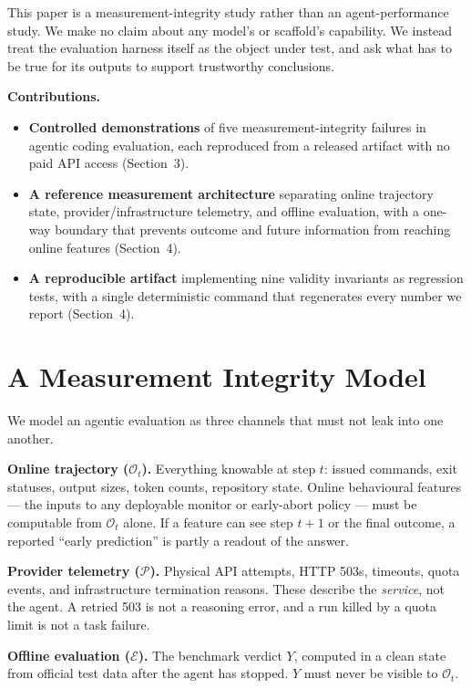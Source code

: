 \documentclass[letterpaper]{article}
\begin{document}
This paper is a measurement-integrity study rather than an agent-performance
study. We make no claim about any model's or scaffold's capability. We instead
treat the evaluation harness itself as the object under test, and ask what has
to be true for its outputs to support trustworthy conclusions.

\vspace{2pt}
\noindent\textbf{Contributions.}
\begin{itemize}\itemsep1pt
\item \textbf{Controlled demonstrations} of five measurement-integrity failures
in agentic coding evaluation, each reproduced from a released artifact with no
paid API access (Section~3).
\item \textbf{A reference measurement architecture} separating online trajectory
state, provider/infrastructure telemetry, and offline evaluation, with a one-way
boundary that prevents outcome and future information from reaching online
features (Section~4).
\item \textbf{A reproducible artifact} implementing nine validity invariants as
regression tests, with a single deterministic command that regenerates every
number we report (Section~4).
\end{itemize}

\section{A Measurement Integrity Model}

We model an agentic evaluation as three channels that must not leak into one
another.

\textbf{Online trajectory ($\mathcal{O}_t$).} Everything knowable at step $t$:
issued commands, exit statuses, output sizes, token counts, repository state.
Online behavioural features --- the inputs to any deployable monitor or
early-abort policy --- must be computable from $\mathcal{O}_t$ alone. If a
feature can see step $t{+}1$ or the final outcome, a reported ``early
prediction'' is partly a readout of the answer.

\textbf{Provider telemetry ($\mathcal{P}$).} Physical API attempts, HTTP 503s,
timeouts, quota events, and infrastructure termination reasons. These describe
the \emph{service}, not the agent. A retried 503 is not a reasoning error, and a
run killed by a quota limit is not a task failure.

\textbf{Offline evaluation ($\mathcal{E}$).} The benchmark verdict $Y$, computed
in a clean state from official test data after the agent has stopped. $Y$ must
never be visible to $\mathcal{O}_t$.
\end{document}
